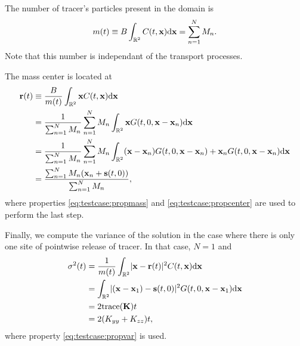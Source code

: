 The number of tracer's particles present in the domain is
\begin{equation}
	m(t) \equiv B \int_{\R[2]} C(t,\b x) \rm d \b x = \sum_{n=1}^{N} M_n.
\end{equation}
Note that this number is independant of the transport processes.

The mass center is located at
\begin{align}
	\b r(t) &\equiv \frac{B}{m(t)} \int_{\R[2]} \b x C(t,\b x) \rm d \b x \nonumber \\
	&= \frac{1}{\sum_{n=1}^N M_n} \sum_{n=1}^N M_n \int_{\R[2]} \b x G(t,0,\b x - \b x_n) \rm d \b x \nonumber\\
	&= \frac{1}{\sum_{n=1}^N M_n} \sum_{n=1}^N M_n \int_{\R[2]} (\b x-\b x_n) G(t,0,\b x - \b x_n) + \b x_n G(t,0,\b x - \b x_n) \rm d \b x\nonumber\\
	&= \frac{\sum_{n=1}^{N} M_n (\b x_n + \b s(t,0))}{\sum_{n=1}^{N} M_n},
\end{align}
where properties \eqref{eq:testcase:propmass} and \eqref{eq:testcase:propcenter} are used to perform the last step.

Finally, we compute the variance of the solution in the case where there is only one site of pointwise release of tracer. In that case, $N = 1$ and
\begin{align}
	\sigma^2(t) &= \frac{1}{m(t)} \int_{\R[2]} \lvert \b x - \b r(t) \rvert^2 C(t,\b x) \rm d \b x \nonumber \\
	&= \int_{\R[2]} \lvert (\b x - \b x_1) - \b s(t,0)\rvert^2 G(t,0,\b x - \b x_1) \rm d \b x \nonumber \\
	&= 2 \mathrm{trace}(\b K)t \nonumber \\
	&= 2(K_{yy}+K_{zz})t,
\end{align}
where property \eqref{eq:testcase:propvar} is used.
